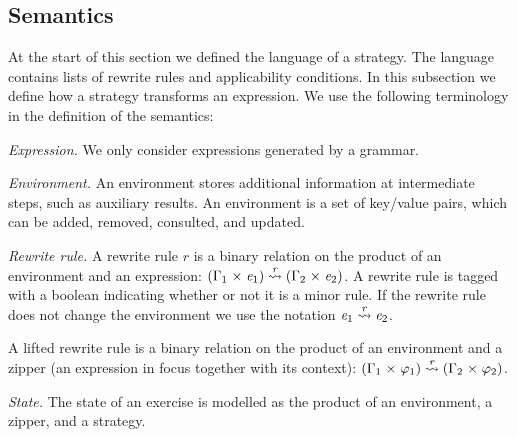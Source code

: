 \documentclass[copyright]{eptcs}
\newcommand{\Varid}[1]{\mathit{#1}}
\begin{document}
\subsection{Semantics}
\label{ssec:semantics}
At the start of this section we defined the language of a strategy. The language
contains lists of rewrite rules and applicability conditions. In this subsection
we define how a strategy transforms an expression. We use the following
terminology in the definition of the semantics:
\begin{itize}
\item[{\it Expression.}] We only consider expressions generated by a grammar.
\item[{\it Environment.}] An environment stores additional information at
  intermediate steps, such as auxiliary results. An environment is a set of
  key/value pairs, which can be added, removed, consulted, and updated.
\item[{\it Rewrite rule.}] A rewrite rule \ensuremath{\Varid{r}} is a binary relation on the
  product of an environment and an expression: \ensuremath{(\Gamma_{1}\mathrel{\times}\Varid{e}_{1})\;{\buildrel \Varid{r} \over \leadsto}\;(\Gamma_{2}\mathrel{\times}\Varid{e}_{2})}. A
  rewrite rule is tagged with a boolean indicating whether or not it is a minor
  rule. If the rewrite rule does not change the environment we use the notation
  \ensuremath{\Varid{e}_{1}\;{\buildrel \Varid{r} \over \leadsto}\;\Varid{e}_{2}}.

  A lifted rewrite rule is a binary relation on the product of an environment
  and a zipper (an expression in focus together with its context): \ensuremath{(\Gamma_{1}\mathrel{\times}\varphi _{1})\;{\buildrel \Varid{r} \over \leadsto}\;(\Gamma_{2}\mathrel{\times}\varphi _{2})}.
\item[{\it State.}] The state of an exercise is modelled as the product of an
  environment, a zipper, and a strategy.
\end{itize}
\end{document}
